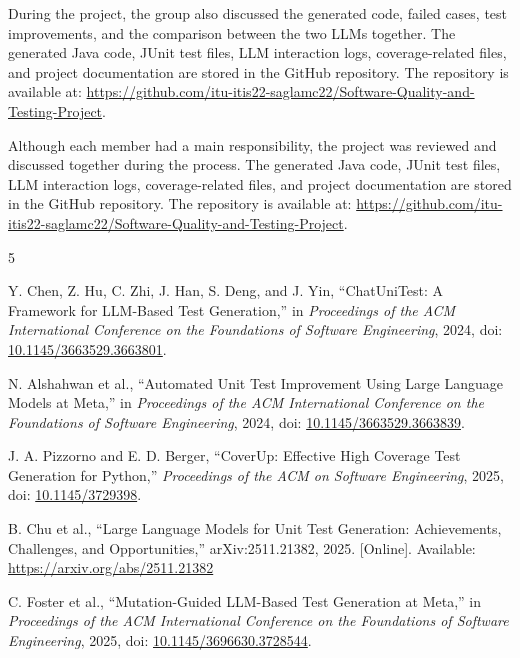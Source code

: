 \documentclass[journal]{IEEEtran}
\begin{document}
During the project, the group also discussed the generated code, failed cases, test improvements, and the comparison between the two LLMs together. The generated Java code, JUnit test files, LLM interaction logs, coverage-related files, and project documentation are stored in the GitHub repository. The repository is available at: \url{https://github.com/itu-itis22-saglamc22/Software-Quality-and-Testing-Project}.

Although each member had a main responsibility, the project was reviewed and discussed together during the process. The generated Java code, JUnit test files, LLM interaction logs, coverage-related files, and project documentation are stored in the GitHub repository. The repository is available at: \url{https://github.com/itu-itis22-saglamc22/Software-Quality-and-Testing-Project}.


\begin{thebibliography}{5}

Y. Chen, Z. Hu, C. Zhi, J. Han, S. Deng, and J. Yin,
``ChatUniTest: A Framework for LLM-Based Test Generation,''
in \emph{Proceedings of the ACM International Conference on the Foundations of Software Engineering},
2024, doi: \href{https://doi.org/10.1145/3663529.3663801}{10.1145/3663529.3663801}.

N. Alshahwan et al.,
``Automated Unit Test Improvement Using Large Language Models at Meta,''
in \emph{Proceedings of the ACM International Conference on the Foundations of Software Engineering},
2024, doi: \href{https://doi.org/10.1145/3663529.3663839}{10.1145/3663529.3663839}.

J. A. Pizzorno and E. D. Berger,
``CoverUp: Effective High Coverage Test Generation for Python,''
\emph{Proceedings of the ACM on Software Engineering},
2025, doi: \href{https://doi.org/10.1145/3729398}{10.1145/3729398}.

B. Chu et al.,
``Large Language Models for Unit Test Generation: Achievements, Challenges, and Opportunities,''
arXiv:2511.21382, 2025. [Online]. Available:
\url{https://arxiv.org/abs/2511.21382}

C. Foster et al.,
``Mutation-Guided LLM-Based Test Generation at Meta,''
in \emph{Proceedings of the ACM International Conference on the Foundations of Software Engineering},
2025, doi: \href{https://doi.org/10.1145/3696630.3728544}{10.1145/3696630.3728544}.

\end{thebibliography}
\end{document}
